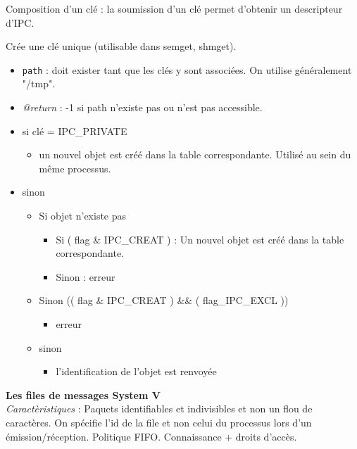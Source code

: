 \documentclass[french]{scrartcl}
\begin{document}
\begin{multicols}{3}
Composition d'un clé : la soumission d'un clé permet d'obtenir un descripteur d'IPC.\\
{
Crée une clé unique (utilisable dans semget, shmget).
\begin{itemize}
	\item \lstinline!path! : doit exister tant que les clés y sont associées. On utilise généralement "/tmp".
	\item \emph{@return} : -1 si path n'existe pas ou n'est pas accessible.
\end{itemize}
}

{
\begin{itemize}
	\item si clé = IPC\_PRIVATE
	\begin{itemize}
		\item un nouvel objet est créé dans la table correspondante. Utilisé au sein du même processus.
	\end{itemize}
	\item sinon
	\begin{itemize}
		\item Si objet n'existe pas
		\begin{itemize}
			\item Si ( flag \& IPC\_CREAT ) : Un nouvel objet est créé dans la table correspondante.
			\item Sinon : erreur
		\end{itemize}
		\item Sinon (( flag \& IPC\_CREAT ) \&\& ( flag\_IPC\_EXCL ))
		\begin{itemize}
			\item erreur
		\end{itemize}
		\item sinon
		\begin{itemize}
			\item l'identification de l'objet est renvoyée
		\end{itemize}
	\end{itemize}
\end{itemize}
}

\vskip 5pt
\textbf{Les files de messages System V}\\

\emph{Caractèristiques} : Paquets identifiables et indivisibles et non un flou de caractères. On spécifie l'id de la file et non celui du processus lors d'un émission/réception. Politique FIFO. Connaissance + droits d'accès.\\


\end{multicols}
\end{document}
